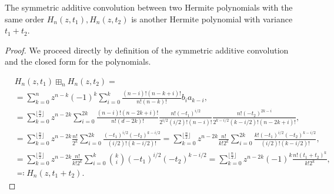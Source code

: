 \begin{proposition} \label{prop:convolution_of_hermites}
The symmetric additive convolution between two Hermite polynomials with the same order $H_n(z,t_1), H_n(z,t_2)$ is another Hermite polynomial with variance $t_1 + t_2$.
\end{proposition}

\begin{proof} We proceed directly by definition of the symmetric additive convolution and the closed form for the polynomials.

    \begin{align*}
        &H_n(z,t_1) \boxplus_n H_n(z,t_2) = \\ 
        &= \sum_{k=0}^n z^{n-k}(-1)^k \sum_{i=0}^k \frac{(n-i)!(n-k+i)!}{n!(n-k)!} b_i a_{k-i}, \\ 
        &= \sum_{k=0}^{\lfloor \frac n2 \rfloor} z^{n-2k} \sum_{i=0}^{2k} \frac{(n-i)!(n-2k+i)!}{n!(d-2k)!} \frac{n!(-t_1)^{i/2}}{2^{i/2} (i/2)! (n-i)!} \frac{n!(-t_2)^{2k-i}}{2^{k-i/2} (k-i/2)! (n-2k+i)!},\\ 
        &= \sum_{k=0}^{\lfloor \frac n2 \rfloor} z^{n-2k}\frac{n!}{2^k} \sum_{i=0}^{2k} \frac{(-t_1)^{i/2}(-t_2)^{k-i/2}}{(i/2)!(k-i/2)!} = \sum_{k=0}^{\lfloor \frac n2 \rfloor} z^{n-2k} \frac{n!}{k!2^k} \sum_{i=0}^{2k} \frac{k!(-t_1)^{i/2}(-t_2)^{k-i/2}}{(i/2)!(k-i/2)!}, \\ 
        &= \sum_{k=0}^{\lfloor \frac n2 \rfloor} z^{n-2k}\frac{n!}{k!2^k} \sum_{i=0}^{k} \binom{k}{i}(-t_1)^{i/2}(-t_2)^{k-i/2} = \sum_{k=0}^{\lfloor \frac n2 \rfloor} z^{n-2k}(-1)^{k} \frac{n!(t_1 + t_2)^k }{k!2^k},\\ 
        &\eqcolon H_n(z,t_1+t_2).
    \end{align*}\end{proof}





